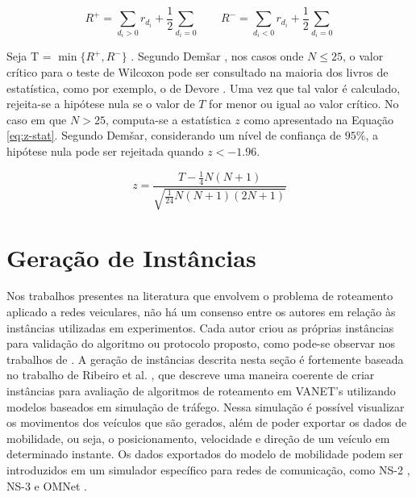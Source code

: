 \begin{equation}
    R^{+} = \sum_{d_i > 0} r_{d_i} + \frac{1}{2}\sum_{d_i = 0} \quad \quad R^{-} = \sum_{d_i < 0} r_{d_i} + \frac{1}{2}\sum_{d_i = 0} \label{eq:r-wilcoxon}
\end{equation}

Seja T = $\min\{R^+, R^{-}\}$ . Segundo Dem\v{s}ar \cite{demsar:2006}, nos casos
onde $N \leq 25$,  o valor crítico para o teste de  Wilcoxon pode ser consultado
na  maioria  dos   livros  de  estatística,  como  por  exemplo,   o  de  Devore
\cite{devore:2011}. Uma  vez que  tal valor é  calculado, rejeita-se  a hipótese
nula se o valor de $T$ for menor ou  igual ao valor crítico. No caso em que $N >
25$, computa-se a estatística $z$ como apresentado na Equação \eqref{eq:z-stat}.
Segundo Dem\v{s}ar,  considerando um  nível de confiança  de $95\%$,  a hipótese
nula pode ser rejeitada quando $z < -1.96$.

\begin{equation}
    z = \frac{T - \frac{1}{4} N(N + 1)}{\sqrt{\frac{1}{24} N(N+1)(2N + 1)}} \label{eq:z-stat}
\end{equation}

\section{Geração de Instâncias} \label{sec:instance-generation}

Nos  trabalhos presentes  na literatura  que envolvem  o problema  de roteamento
aplicado a redes veiculares,  não há um consenso entre os  autores em relação às
instâncias utilizadas em  experimentos. Cada autor criou  as próprias instâncias
para validação  do algoritmo  ou protocolo proposto,  como pode-se  observar nos
trabalhos  de   \cite{BITAM2013981,  fazio:2013,   tiago:2019}.  A   geração  de
instâncias descrita nesta  seção é fortemente baseada no trabalho  de Ribeiro et
al. \cite{tiago:2019},  que descreve  uma maneira  coerente de  criar instâncias
para  avaliação  de  algoritmos  de roteamento  em  VANET's  utilizando  modelos
baseados  em simulação  de tráfego.  Nessa  simulação é  possível visualizar  os
movimentos dos  veículos que  são gerados,  além de poder  exportar os  dados de
mobilidade, ou  seja, o posicionamento,  velocidade e  direção de um  veículo em
determinado  instante. Os  dados exportados  do modelo  de mobilidade  podem ser
introduzidos em  um simulador  específico para redes  de comunicação,  como NS-2
\cite{Issariyakul:2010}, NS-3 \cite{Riley2010} e OMNet \cite{Varga:2008}.

